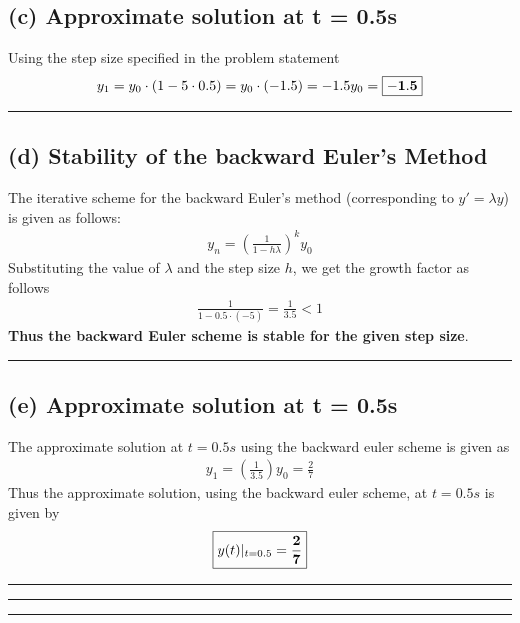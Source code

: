 \subsection*{(c) Approximate solution at t = 0.5s}
Using the step size specified in the problem statement 
\begin{align*}
y_1 = y_0 \cdot (1- 5\cdot 0.5) = y_0 \cdot  (-1.5) = -1.5 y_0 = \boxed{\bf -1.5}
\end{align*}\hrule
\subsection*{(d) Stability of the backward Euler's Method}
The iterative scheme for the backward Euler's method (corresponding to $y' = \lambda y$) is given as follows:
\begin{align*}
y_n = {\left( \frac{1}{1-h\lambda}\right)}^k y_0
\end{align*}
Substituting the value of $\lambda$ and the step size $h$, we get the growth factor as follows
\begin{align*}
\frac{1}{1-0.5\cdot(-5)} = \frac{1}{3.5} < 1
\end{align*}
{\bf Thus the backward Euler scheme is stable for the given step size}. \\ \hrule
\subsection*{(e) Approximate solution at t = 0.5s}
The approximate solution at $t=0.5s$ using the backward euler scheme is given as 
\begin{align*}
y_1
=
\left(
\frac{1}{3.5}
\right) y_0 
=
\frac{2}{7}
\end{align*}
Thus the approximate solution, using the backward euler scheme, at $t=0.5s$ is given by 
\begin{align*}
\boxed{
y(t)|_{t=0.5} = {\bf \frac{2}{7}}
}
\end{align*}\hrule\hrule\hrule

